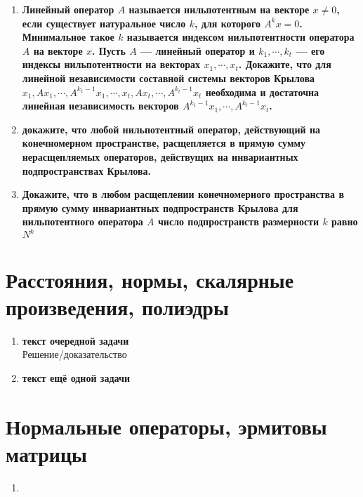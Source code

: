 \documentclass[12pt]{article} %
\begin{document}
\begin{enumerate}
    \item \textbf{Линейный оператор $A$ называется нильпотентным на векторе $x \neq 0$, если существует натуральное число $k$, для которого $A^kx = 0$. Минимальное такое $k$ называется индексом нильпотентности оператора $A$  на векторе $x$. Пусть $A$ --- линейный оператор и $k_1, \cdots, k_t$ --- его индексы нильпотентности на векторах $x_1, \cdots, x_t$. Докажите, что для линейной независимости составной системы векторов Крылова $x_1, Ax_1, \cdots, A^{k_1 - 1}x_1, \cdots , x_t, Ax_t, \cdots, A^{k_t - 1}x_t$ необходима и достаточна линейная независимость векторов $A^{k_1 - 1}x_1, \cdots, A^{k_t - 1}x_t$.}
    \item \textbf{докажите, что любой нильпотентный оператор, действующий на конечномерном пространстве, расщепляется в прямую сумму нерасщепляемых операторов, действущих на инвариантных подпространствах Крылова.}
    \item \textbf{Докажите, что в любом расщеплении конечномерного пространства в прямую сумму инвариантных подпространств Крылова для нильпотентного оператора $A$ число подпространств размерности $k$ равно $N^k$}
\end{enumerate}
\section{Расстояния, нормы, скалярные произведения, полиэдры}
\begin{enumerate}%
    \item \textbf{текст очередной задачи}\\

    Решение/доказательство
    \item \textbf{текст ещё одной задачи}%
\end{enumerate}
\section{Нормальные операторы, эрмитовы матрицы}
\begin{enumerate}
    \item 
\end{enumerate}
\end{document}
